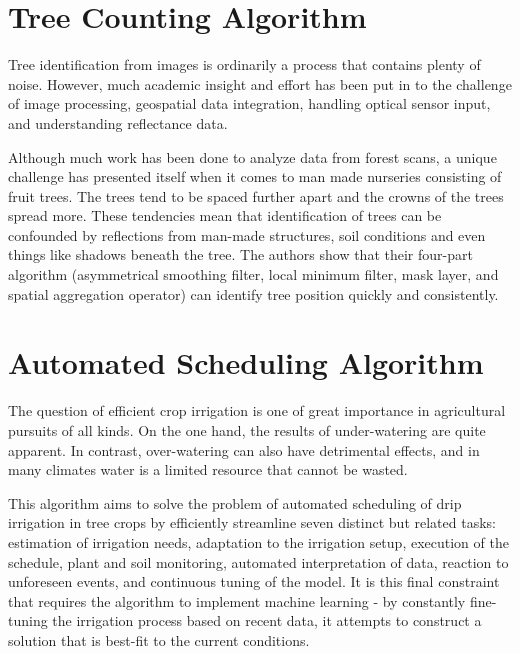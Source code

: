 \documentclass[]{article}
\begin{document}
\section{Tree Counting Algorithm}
Tree identification from images is ordinarily a process that contains plenty of noise. However, much academic insight and effort has been put in to the challenge of image processing, geospatial data integration, handling optical sensor input, and understanding reflectance data.  

Although much work has been done to analyze data from forest scans, a unique challenge has presented itself when it comes to man made nurseries consisting of fruit trees\cite[Santoro 2013]{santoro2013tree}.  The trees tend to be spaced further apart and the crowns of the trees spread more. These tendencies mean that identification of trees can be confounded by reflections from man-made structures, soil conditions and even things like shadows beneath the tree. The authors show that their four-part algorithm (asymmetrical smoothing filter, local minimum filter, mask layer, and spatial aggregation operator) can identify tree position quickly and consistently. 

\section{Automated Scheduling Algorithm}
The question of efficient crop irrigation is one of great importance in agricultural pursuits of all kinds. On the one hand, the results of under-watering are quite apparent. In contrast, over-watering can also have detrimental effects, and in many climates water is a limited resource that cannot be wasted.

This algorithm aims to solve the problem of automated scheduling of drip irrigation in tree crops by efficiently streamline seven distinct but related tasks: estimation of irrigation needs, adaptation to the irrigation setup, execution of the schedule, plant and soil monitoring, automated interpretation of data, reaction to unforeseen events, and continuous tuning of the model\cite[Casadesus 2012]{casadesus2012drip}. It is this final constraint that requires the algorithm to implement machine learning - by constantly fine-tuning the irrigation process based on recent data, it attempts to construct a solution that is best-fit to the current conditions.
\cite[Casadesus 2012]{casadesus2012drip}


\end{document}
